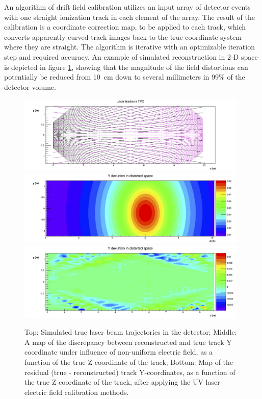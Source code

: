An algorithm of drift field calibration utilizes an input array of detector events with one straight ionization track in each element of the array. The result of the calibration is a coordinate correction map, to be applied to each track, which converts apparently curved track images back to the true coordinate system where they are straight. The algorithm is iterative with an optimizable iteration step and required accuracy. An example of simulated reconstruction in 2-D space is depicted in figure \ref{Reco}, showing that the magnitude of the field distortions can potentially be reduced from 10~cm down to several millimeters in 99\% of the detector volume.


\begin{figure}
\centering	
\includegraphics[width=0.98\textwidth]{figures/Original_Tracks.jpg}
\includegraphics[width=0.98\textwidth]{figures/Ydev.jpg}
\includegraphics[width=0.98\textwidth]{figures/Yresidual.jpg}
\caption{Top: Simulated true laser beam trajectories in the detector; Middle: A map of the discrepancy between reconstructed and true track Y coordinate under influence of non-uniform electric field, as a function of the true Z coordinate of the track; Bottom: Map of the residual (true - reconstructed) track Y-coordinates, as a function of the true Z coordinate of the track, after applying the UV laser electric field calibration methods.} 
\label{Reco}
\end{figure}


